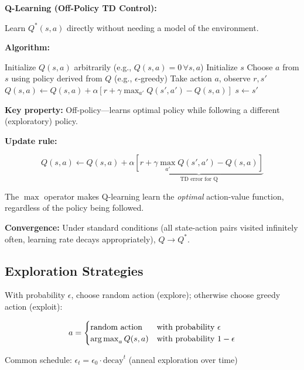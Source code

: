 \begin{seanbox}{5.6}
\textbf{Q-Learning (Off-Policy TD Control):}

Learn $Q^*(s, a)$ directly without needing a model of the environment.

\textbf{Algorithm:}

\begin{algorithmic}[1]
\State Initialize $Q(s, a)$ arbitrarily (e.g., $Q(s, a) = 0 \, \forall s, a$)
    \State Initialize $s$
        \State Choose $a$ from $s$ using policy derived from $Q$ (e.g., $\epsilon$-greedy)
        \State Take action $a$, observe $r, s'$
        \State $Q(s, a) \leftarrow Q(s, a) + \alpha \left[ r + \gamma \max_{a'} Q(s', a') - Q(s, a) \right]$
        \State $s \leftarrow s'$
    \EndFor
\EndFor
\end{algorithmic}

\textbf{Key property:} Off-policy---learns optimal policy while following a different (exploratory) policy.

\textbf{Update rule:}

\begin{equation}
    Q(s, a) \leftarrow Q(s, a) + \alpha \underbrace{\left[ r + \gamma \max_{a'} Q(s', a') - Q(s, a) \right]}_{\text{TD error for Q}}
\end{equation}

The $\max$ operator makes Q-learning learn the \textit{optimal} action-value function, regardless of the policy being followed.

\textbf{Convergence:} Under standard conditions (all state-action pairs visited infinitely often, learning rate decays appropriately), $Q \to Q^*$.
\end{seanbox}

\subsection{Exploration Strategies}

\begin{definition}
With probability $\epsilon$, choose random action (explore); otherwise choose greedy action (exploit):

\begin{equation}
    a = \begin{cases}
        \text{random action} & \text{with probability } \epsilon \\
        \operatorname*{arg\,max}_a Q(s, a) & \text{with probability } 1 - \epsilon
    \end{cases}
\end{equation}

Common schedule: $\epsilon_t = \epsilon_0 \cdot \text{decay}^t$ (anneal exploration over time)
\end{definition}

